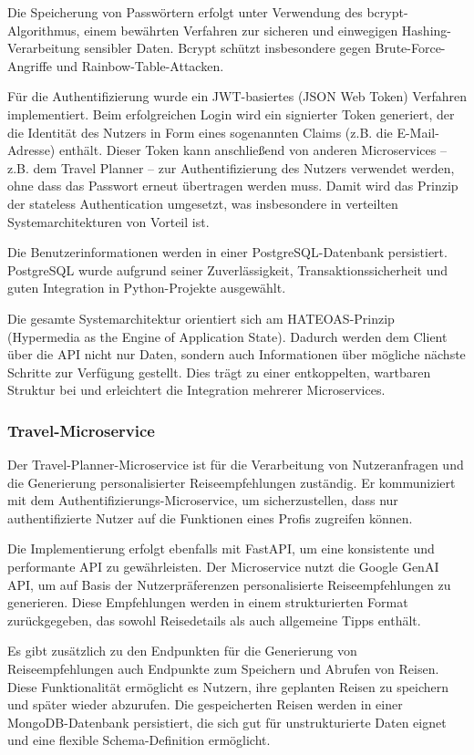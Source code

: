 Die Speicherung von Passwörtern erfolgt unter Verwendung des bcrypt-Algorithmus, einem bewährten Verfahren zur sicheren und einwegigen Hashing-Verarbeitung sensibler Daten. Bcrypt schützt insbesondere gegen Brute-Force-Angriffe und Rainbow-Table-Attacken.

Für die Authentifizierung wurde ein JWT-basiertes (JSON Web Token) Verfahren implementiert. Beim erfolgreichen Login wird ein signierter Token generiert, der die Identität des Nutzers in Form eines sogenannten Claims (z.B. die E-Mail-Adresse) enthält. Dieser Token kann anschließend von anderen Microservices – z.B. dem Travel Planner – zur Authentifizierung des Nutzers verwendet werden, ohne dass das Passwort erneut übertragen werden muss. Damit wird das Prinzip der stateless Authentication umgesetzt, was insbesondere in verteilten Systemarchitekturen von Vorteil ist.

Die Benutzerinformationen werden in einer PostgreSQL-Datenbank persistiert. PostgreSQL wurde aufgrund seiner Zuverlässigkeit, Transaktionssicherheit und guten Integration in Python-Projekte ausgewählt.

Die gesamte Systemarchitektur orientiert sich am HATEOAS-Prinzip (Hypermedia as the Engine of Application State). Dadurch werden dem Client über die API nicht nur Daten, sondern auch Informationen über mögliche nächste Schritte zur Verfügung gestellt. Dies trägt zu einer entkoppelten, wartbaren Struktur bei und erleichtert die Integration mehrerer Microservices.

\subsubsection{Travel-Microservice}

Der Travel-Planner-Microservice ist für die Verarbeitung von Nutzeranfragen und die Generierung personalisierter Reiseempfehlungen zuständig. Er kommuniziert mit dem Authentifizierungs-Microservice, um sicherzustellen, dass nur authentifizierte Nutzer auf die Funktionen eines Profis zugreifen können.

Die Implementierung erfolgt ebenfalls mit FastAPI, um eine konsistente und performante API zu gewährleisten. Der Microservice nutzt die Google GenAI API, um auf Basis der Nutzerpräferenzen personalisierte Reiseempfehlungen zu generieren. Diese Empfehlungen werden in einem strukturierten Format zurückgegeben, das sowohl Reisedetails als auch allgemeine Tipps enthält.

Es gibt zusätzlich zu den Endpunkten für die Generierung von Reiseempfehlungen auch Endpunkte zum Speichern und Abrufen von Reisen. Diese Funktionalität ermöglicht es Nutzern, ihre geplanten Reisen zu speichern und später wieder abzurufen. Die gespeicherten Reisen werden in einer MongoDB-Datenbank persistiert, die sich gut für unstrukturierte Daten eignet und eine flexible Schema-Definition ermöglicht.

